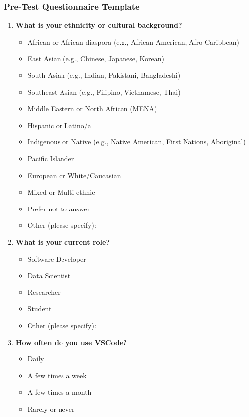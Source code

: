 \documentclass{article}
\begin{document}
\subsubsection{Pre-Test Questionnaire Template}
\begin{enumerate}
    \item \textbf{What is your ethnicity or cultural background?}
    \begin{itemize}[label=$\square$]
        \item African or African diaspora (e.g., African American, Afro-Caribbean)
        \item East Asian (e.g., Chinese, Japanese, Korean)
        \item South Asian (e.g., Indian, Pakistani, Bangladeshi)
        \item Southeast Asian (e.g., Filipino, Vietnamese, Thai)
        \item Middle Eastern or North African (MENA)
        \item Hispanic or Latino/a
        \item Indigenous or Native (e.g., Native American, First Nations, Aboriginal)
        \item Pacific Islander
        \item European or White/Caucasian
        \item Mixed or Multi-ethnic
        \item Prefer not to answer
        \item Other (please specify): \underline{\hspace{5cm}}
    \end{itemize}
    
    \item \textbf{What is your current role?}
    \begin{itemize}[label=$\square$]
        \item Software Developer
        \item Data Scientist  
        \item Researcher
        \item Student
        \item Other (please specify): \underline{\hspace{5cm}}
    \end{itemize}

    \item \textbf{How often do you use VSCode?}
    \begin{itemize}[label=$\square$]
        \item Daily
        \item A few times a week
        \item A few times a month
        \item Rarely or never
    \end{itemize}


\end{enumerate}
\end{document}
